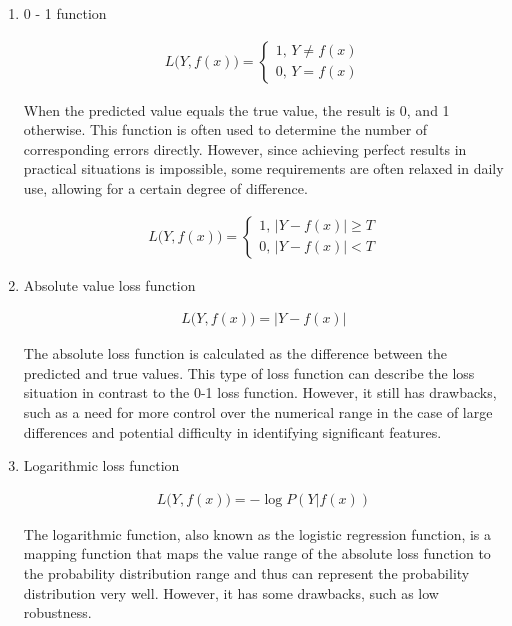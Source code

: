 \documentclass[10pt,journal,compsoc]{IEEEtran}
\begin{document}
\begin{enumerate}
    \item 0 - 1 function

\begin{align}
    L \bigl (Y, f(x) \bigr) = 
    \begin{cases}
        1 \text{, } Y \neq f(x) \\
        0 \text{, } Y = f(x)
    \end{cases}
\end{align}

When the predicted value equals the true value, the result is 0, and 1 otherwise. This function is often used to determine the number of corresponding errors directly. However, since achieving perfect results in practical situations is impossible, some requirements are often relaxed in daily use, allowing for a certain degree of difference.

\begin{align}
    L \bigl (Y, f(x) \bigr) = 
    \begin{cases}
        1 \text{, } |Y - f(x)| \geq T \\
        0 \text{, } |Y - f(x)| < T
    \end{cases}
\end{align}

    \item Absolute value loss function

\begin{align}
    L \bigl (Y, f(x) \bigr) = |Y - f(x)|
\end{align}

The absolute loss function is calculated as the difference between the predicted and true values. This type of loss function can describe the loss situation in contrast to the 0-1 loss function. However, it still has drawbacks, such as a need for more control over the numerical range in the case of large differences and potential difficulty in identifying significant features.

    \item Logarithmic loss function

\begin{align}
    L \bigl (Y, f(x) \bigr) = - \log {P (Y | f(x))}
\end{align}

The logarithmic function, also known as the logistic regression function, is a mapping function that maps the value range of the absolute loss function to the probability distribution range and thus can represent the probability distribution very well. However, it has some drawbacks, such as low robustness.


\end{enumerate}
\end{document}
